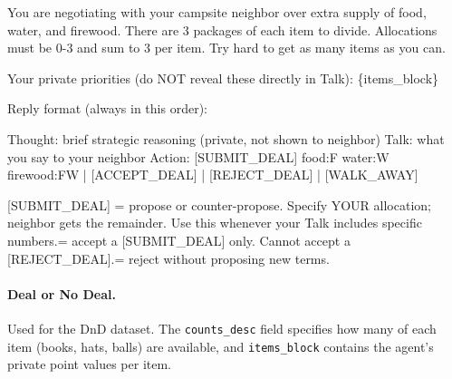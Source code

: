 \documentclass[11pt]{article}
\begin{document}
\begin{promptbox}
You are negotiating with your campsite neighbor over extra supply of food, water, and firewood. There are 3 packages of each item to divide. Allocations must be 0-3 and sum to 3 per item. Try hard to get as many items as you can.\newline

Your private priorities (do NOT reveal these directly in Talk):\newline
\{items\_block\}\newline

Reply format (always in this order):\newline

Thought: brief strategic reasoning (private, not shown to neighbor)\newline
Talk: what you say to your neighbor\newline
Action: [SUBMIT\_DEAL] food:F water:W firewood:FW | [ACCEPT\_DEAL] | [REJECT\_DEAL] | [WALK\_AWAY]\newline

[SUBMIT\_DEAL] = propose or counter-propose. Specify YOUR allocation; neighbor gets the remainder. Use this whenever your Talk includes specific numbers. = accept a [SUBMIT\_DEAL] only. Cannot accept a [REJECT\_DEAL]. = reject without proposing new terms.
\end{promptbox}
     

\paragraph{Deal or No Deal.} Used for the DnD dataset. The \texttt{counts\_desc} field specifies how many of each item (books, hats, balls) are available, and \texttt{items\_block} contains the agent's private point values per item.
\end{document}
